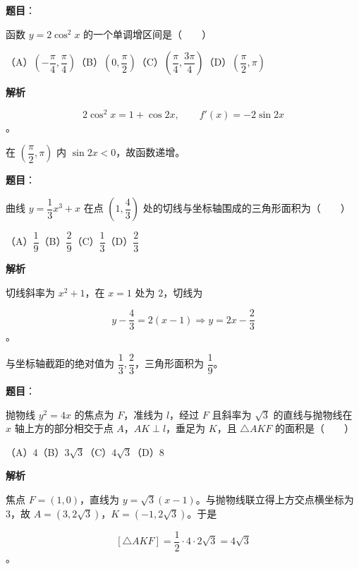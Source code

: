 \begin{answer}

\textbf{题目}：

函数 $y=2\cos^2x$ 的一个单调增区间是\mbox{（　　）}

（A）$\left(-\dfrac\pi4,\dfrac\pi4\right)$\quad（B）$\left(0,\dfrac\pi2\right)$\quad（C）$\left(\dfrac\pi4,\dfrac{3\pi}4\right)$\quad（D）$\left(\dfrac\pi2,\pi\right)$

\textbf{解析}

\nopagebreak[4]
\[
2\cos^2x=1+\cos2x,\qquad
f'(x)=-2\sin2x
\]
。

在 $\left(\dfrac\pi2,\pi\right)$ 内 $\sin2x<0$，故函数递增。


\end{answer}
\begin{answer}

\textbf{题目}：

曲线 $y=\dfrac13x^3+x$ 在点 $\left(1,\dfrac43\right)$ 处的切线与坐标轴围成的三角形面积为\mbox{（　　）}

（A）$\dfrac19$\quad（B）$\dfrac29$\quad（C）$\dfrac13$\quad（D）$\dfrac23$

\textbf{解析}

切线斜率为 $x^2+1$，在 $x=1$ 处为 $2$，切线为

\nopagebreak[4]
\[
y-\frac43=2(x-1)\Longrightarrow y=2x-\frac23
\]
。

与坐标轴截距的绝对值为 $\dfrac13,\dfrac23$，三角形面积为 $\dfrac19$。


\end{answer}
\begin{answer}

\textbf{题目}：

抛物线 $y^2=4x$ 的焦点为 $F$，准线为 $l$，经过 $F$ 且斜率为 $\sqrt3$ 的直线与抛物线在 $x$ 轴上方的部分相交于点 $A$，$AK\perp l$，垂足为 $K$，且 $\triangle AKF$ 的面积是\mbox{（　　）}

（A）$4$\quad（B）$3\sqrt3$\quad（C）$4\sqrt3$\quad（D）$8$

\textbf{解析}

焦点 $F=(1,0)$，直线为 $y=\sqrt3(x-1)$。与抛物线联立得上方交点横坐标为 $3$，故 $A=(3,2\sqrt3)$，$K=(-1,2\sqrt3)$。于是

\nopagebreak[4]
\[
[\triangle AKF]=\frac12\cdot4\cdot2\sqrt3=4\sqrt3
\]
。


\end{answer}
